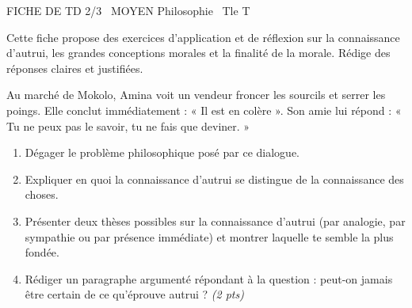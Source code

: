 \documentclass[11pt]{article}
\begin{document}
\begin{tcolorbox}[enhanced,colback=popink,colframe=popink,arc=10pt,boxrule=0pt,left=12pt,right=12pt,top=9pt,bottom=9pt]
{\color{white}\popxbold\small FICHE DE TD 2/3 \textbullet\ MOYEN \hfill Philosophie \textbullet\ Tle T\par}
\end{tcolorbox}
\vspace{4pt}
Cette fiche propose des exercices d'application et de réflexion sur la connaissance d'autrui, les grandes conceptions morales et la finalité de la morale. Rédige des réponses claires et justifiées.

\begin{exercice}
Au marché de Mokolo, Amina voit un vendeur froncer les sourcils et serrer les poings. Elle conclut immédiatement : « Il est en colère ». Son amie lui répond : « Tu ne peux pas le savoir, tu ne fais que deviner. »
\begin{enumerate}
\item Dégager le problème philosophique posé par ce dialogue.
\item Expliquer en quoi la connaissance d'autrui se distingue de la connaissance des choses.
\item Présenter deux thèses possibles sur la connaissance d'autrui (par analogie, par sympathie ou par présence immédiate) et montrer laquelle te semble la plus fondée.
\item Rédiger un paragraphe argumenté répondant à la question : peut-on jamais être certain de ce qu'éprouve autrui ? \textit{(2 pts)}
\end{enumerate}
\end{exercice}
\end{document}
